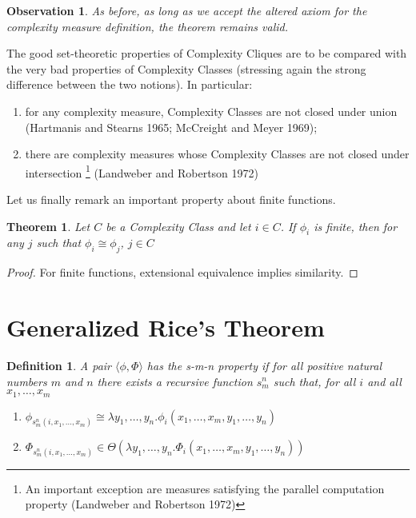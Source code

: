 \documentclass[10pt, a4paper, oneside, titlepage, draft]{article}
\newtheorem{definition}[shrd]{Definition}
\newtheorem{observation}{Observation}[shrd]
\newtheorem{theorem}[shrd]{Theorem}
\begin{document}
\begin{observation}
    As before, as long as we accept the altered axiom for the complexity measure definition, the theorem remains valid.
\end{observation}

The good set-theoretic properties of Complexity Cliques are to be compared with the very bad properties of Complexity Classes (stressing again the strong difference between the two notions). In particular:
\begin{enumerate}
    \item for any complexity measure, Complexity Classes are not closed under union (Hartmanis and Stearns 1965; McCreight and Meyer 1969);
    \item there are complexity measures whose Complexity Classes are not closed under intersection \footnote{An important exception are measures satisfying the parallel computation
    property (Landweber and Robertson 1972)} (Landweber and Robertson 1972)
\end{enumerate}

Let us finally remark an important property about finite functions.

\begin{theorem}
    Let $C$ be a Complexity Class and let $i \in C$. If $\phi_i$ is finite, then for any $j$ such that $\phi_i \cong \phi_j$, $j \in C$
\end{theorem}

\begin{proof}
    For finite functions, extensional equivalence implies similarity.
\end{proof}

\section{Generalized Rice's Theorem}

\begin{definition}
    A pair $\langle \phi, \Phi \rangle$ has the \emph{s-m-n property} if for all positive natural numbers $m$ and $n$ there exists a recursive function $s_m^n$ such that, for all $i$ and all $x_1, \dots, x_m$ 
    \begin{enumerate}[label=(\alph*)]
        \item $ \phi_{s_m^n (i,x_1,\dots,x_m)} \cong \lambda y_1,\dots,y_n . \phi_i (x_1,\dots,x_m,y_1,\dots,y_n)  $
        \item $ \Phi_{s_m^n (i,x_1,\dots,x_m)} \in  \Theta(\lambda y_1,\dots,y_n . \Phi_i (x_1,\dots,x_m,y_1,\dots,y_n))  $
    \end{enumerate}
\end{definition}
\end{document}
